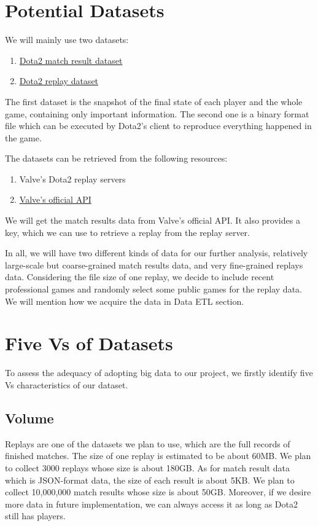 \documentclass{article}
\newcommand{\bigdataVs}[1]{
	\subsection{#1}
}
\begin{document}
\section{Potential Datasets}
We will mainly use two datasets:

\begin{enumerate}
\item \href{https://wiki.teamfortress.com/wiki/WebAPI/GetMatchDetails}{Dota2 match result dataset}
\item \href{https://wiki.teamfortress.com/wiki/Replay}{Dota2 replay dataset}
\end{enumerate}

The first dataset is the snapshot of the final state of each player and the whole game, containing only important information.
The second one is a binary format file which can be executed by Dota2's client to reproduce everything happened in the game.

The datasets can be retrieved from the following resources:

\begin{enumerate}
\item Valve's Dota2 replay servers
\item \href{https://wiki.teamfortress.com/wiki/WebAPI}{Valve's official API}
\end{enumerate}

We will get the match results data from Valve's official API.
It also provides a key, which we can use to retrieve a replay from the replay server.

In all, we will have two different kinds of data for our further analysis, relatively large-scale but coarse-grained match results data, and very fine-grained replays data.
Considering the file size of one replay, we decide to include recent professional games and randomly select some public games for the replay data.
We will mention how we acquire the data in Data ETL section.

\section{Five Vs of Datasets}

To assess the adequacy of adopting big data to our project, we firstly identify five Vs characteristics of our dataset.

\bigdataVs{Volume}

Replays are one of the datasets we plan to use, which are the full records of finished matches. The size of one replay is estimated to be about 60MB. We plan to collect 3000 replays whose size is about 180GB. As for match result data which is JSON-format data, the size of each result is about 5KB. We plan to collect 10,000,000 match results whose size is about 50GB. Moreover, if we desire more data in future implementation, we can always access it as long as Dota2 still has players.
\end{document}

